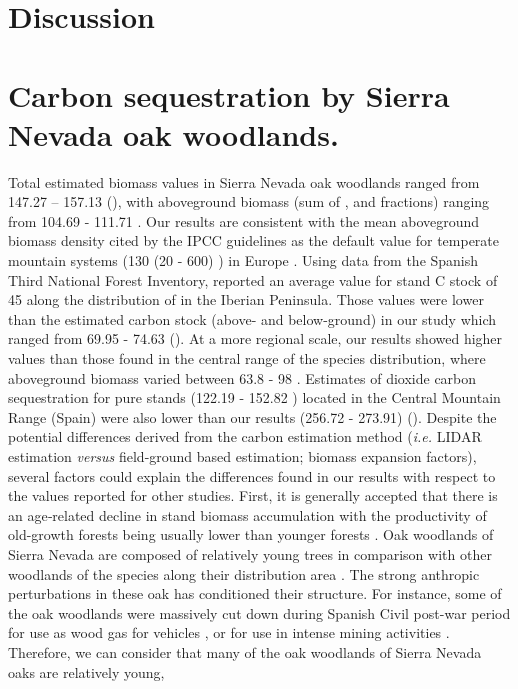 \section{Discussion}\label{sec:carbon:discussion}
\section{Carbon sequestration by Sierra Nevada oak woodlands.}\label{sec:carbon:discussion-sn}

Total estimated biomass values in Sierra Nevada oak woodlands ranged from 147.27 -- 157.13 \mgha (), with aboveground biomass (sum of \ws, \wb and \wbs fractions) ranging from 104.69 - 111.71 \mgha. Our results are consistent with the mean aboveground biomass density cited by the IPCC guidelines as the default value for temperate mountain systems (130 (20 - 600) \mgha) in Europe \autocite{IPCC2006ForestLand}. Using data from the Spanish Third National Forest Inventory, \autocite{Vayredaetal2012SpatialPatterns} reported an average value for stand C stock of 45 \mgha along the distribution of \Qp in the Iberian Peninsula. Those values were lower than the estimated carbon stock (above- and below-ground) in our study which ranged from 69.95 - 74.63 \mgha (). At a more regional scale, our results showed higher values than those found in the central range of the species distribution, where aboveground biomass varied between 63.8 - 98 \mgha \autocite{GallardoLanchoGonzalezHernandez2004SequestrationCarbon}. Estimates of dioxide carbon sequestration for \Qp pure stands (122.19 - 152.82 \mgha) located in the Central Mountain Range (Spain) \autocite{Canellasetal2008SilvicultureCarbon,Canellasetal2017CarbonSequestration} were also lower than our results (256.72 - 273.91) (). Despite the potential differences derived from the carbon estimation method (\emph{i.e.} LIDAR estimation \emph{versus} field-ground based estimation; biomass expansion factors), several factors could explain the differences found in our results with respect to the values reported for other studies. First, it is generally accepted that there is an age‐related decline in stand biomass accumulation \autocite[ and references therein]{Xuetal2012AgerelatedDecline} with the productivity of old-growth forests being usually lower than younger forests \autocite{Kutschetal2009EcophysiologicalCharacteristics}. Oak woodlands of Sierra Nevada are composed of relatively young trees \autocite{GeaIzquierdoCanellas2014LocalClimate,PerezLuqueetal2020LanduseLegacies,RubioCuadradoetal2018AbioticFactors} in comparison with other woodlands of the species along their distribution area \autocite{GeaIzquierdoCanellas2014LocalClimate}. The strong anthropic perturbations in these oak has conditioned their structure. For instance, some of the oak woodlands were massively cut down during Spanish Civil post-war period for use as wood gas for vehicles \autocite[\emph{e.g.} MON population;][]{Prieto1975BosquesSierra}, or for use in intense mining activities \autocite[\emph{e.g.} GEN population;][]{PerezLuqueetal2020LanduseLegacies}. Therefore, we can consider that many of the oak woodlands of Sierra Nevada oaks are relatively young, 